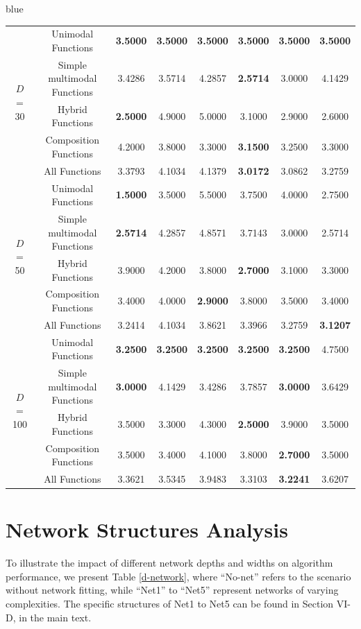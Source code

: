 \documentclass[journal, onecolumn]{IEEEtran}
\begin{document}
\begin{color}{blue}
\begin{table}[h]
{\begin{tabular}{c|c|cccccc}
			\multirow{5}{*}{$D$ = 30}	
			& Unimodal Functions & \textbf{3.5000} &  \textbf{3.5000} &  \textbf{3.5000}&  \textbf{3.5000} &  \textbf{3.5000} &  \textbf{3.5000}\\
			& Simple multimodal Functions & 3.4286 & 3.5714 & 4.2857 & \textbf{2.5714} & 3.0000 & 4.1429 \\
			& Hybrid Functions  & \textbf{2.5000} & 4.9000 & 5.0000 & 3.1000 & 2.9000 & 2.6000 \\
			& Composition Functions & 4.2000 & 3.8000 & 3.3000 & \textbf{3.1500} & 3.2500 & 3.3000 \\
			& All Functions & 3.3793 & 4.1034 & 4.1379 & \textbf{3.0172} & 3.0862 & 3.2759 \\
			\hline
			
			\multirow{5}{*}{$D$ = 50}	
			& Unimodal Functions & \textbf{1.5000} &  3.5000 &  5.5000 &  3.7500 &  4.0000 &  2.7500 \\
			& Simple multimodal Functions & \textbf{2.5714} & 4.2857 & 4.8571 & 3.7143 & 3.0000 & 2.5714 \\
			& Hybrid Functions & 3.9000 & 4.2000 & 3.8000 & \textbf{2.7000} & 3.1000 & 3.3000 \\
			& Composition Functions & 3.4000 & 4.0000 & \textbf{2.9000} & 3.8000 & 3.5000 & 3.4000 \\
			& All Functions & 3.2414 & 4.1034 & 3.8621 & 3.3966 & 3.2759 & \textbf{3.1207} \\
			\hline	
			
			\multirow{5}{*}{$D$ = 100}	
			& Unimodal Functions & \textbf{3.2500} &  \textbf{3.2500} &  \textbf{3.2500} &  \textbf{3.2500} &  \textbf{3.2500} &  4.7500 \\
			& Simple multimodal Functions& \textbf{3.0000} & 4.1429 & 3.4286 & 3.7857 & \textbf{3.0000} & 3.6429 \\
			& Hybrid Functions & 3.5000 & 3.3000 & 4.3000 & \textbf{2.5000} & 3.9000 & 3.5000 \\
			& Composition Functions & 3.5000 & 3.4000 & 4.1000 & 3.8000 & \textbf{2.7000} & 3.5000 \\
			& All Functions & 3.3621 & 3.5345 & 3.9483 & 3.3103 & \textbf{3.2241} & 3.6207 \\
			\hline
		\end{tabular}
		\vspace{-2mm}
	}
\end{table}

\section{Network Structures Analysis}\label{ns-a}
To illustrate the impact of different network depths and widths on algorithm performance, we present Table \ref{d-network}, where ``No-net'' refers to the scenario without network fitting, while ``Net1'' to ``Net5'' represent networks of varying complexities. The specific structures of Net1 to Net5 can be found in Section VI-D, in the main text.


\end{color}
\end{document}
